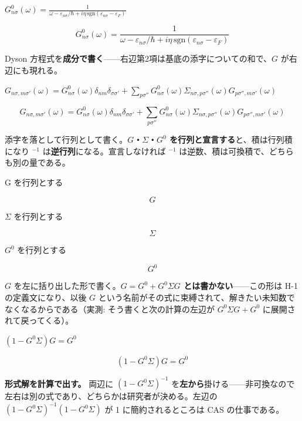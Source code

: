 \documentclass[dvipdfmx,a4paper,11pt]{jsarticle}
\begin{document}
$G^0_{n\sigma}(\omega) = \frac{1}{\omega - \varepsilon_{n\sigma}/\hbar + i\eta\,\mathrm{sgn}(\varepsilon_{n\sigma}-\varepsilon_F)}$

\begin{equation}
  G^0_{n\sigma}(\omega) = \frac{1}{\omega - \varepsilon_{n\sigma}/\hbar + i\eta\,\mathrm{sgn}(\varepsilon_{n\sigma}-\varepsilon_F)}
  \label{eq:E18}
\end{equation}

Dyson 方程式を\textbf{成分で書く}——右辺第2項は基底の添字についての和で、$G$ が右辺にも現れる。

$G_{n\sigma,m\sigma'}(\omega) = G^0_{n\sigma}(\omega)\delta_{nm}\delta_{\sigma\sigma'} + \sum_{p \sigma''} G^0_{n\sigma}(\omega) \Sigma_{n\sigma,p\sigma''}(\omega) G_{p\sigma'',m\sigma'}(\omega)$

\begin{equation}
  G_{n\sigma,m\sigma'}(\omega) = G^0_{n\sigma}(\omega)\delta_{nm}\delta_{\sigma\sigma'} + \sum_{p \sigma''} G^0_{n\sigma}(\omega) \Sigma_{n\sigma,p\sigma''}(\omega) G_{p\sigma'',m\sigma'}(\omega)
  \label{eq:E19}
\end{equation}

添字を落として行列として書く。\textbf{$G$・$\Sigma$・$G^0$ を行列と宣言する}と、積は行列積になり $^{-1}$ は\textbf{逆行列}になる。宣言しなければ $^{-1}$ は逆数、積は可換積で、どちらも別の量である。

G を行列とする

\[
  G
\]

$\Sigma$ を行列とする

\[
  \Sigma
\]

$G^0$ を行列とする

\[
  G^{0}
\]

$G$ を左に括り出した形で書く。\textbf{$G = G^0 + G^0\Sigma G$ とは書かない}——この形は H-1 の定義文になり、以後 $G$ という名前がその式に束縛されて、解きたい未知数でなくなるからである（実測: そう書くと次の計算の左辺が $G^0\Sigma G+G^0$ に展開されて戻ってくる）。

$(1 - G^0 \Sigma) G = G^0$

\begin{equation}
  (1 - G^0 \Sigma) G = G^0
  \label{eq:E20}
\end{equation}

\textbf{形式解を計算で出す。} 両辺に $(1-G^0\Sigma)^{-1}$ を\textbf{左から}掛ける——非可換なので左右は別の式であり、どちらかは研究者が決める。左辺の $(1-G^0\Sigma)^{-1}(1-G^0\Sigma)$ が 1 に簡約されるところは CAS の仕事である。
\end{document}
